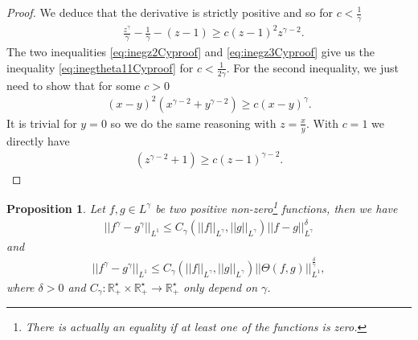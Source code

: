 \documentclass[a4paper, 15pt]{article}
\numberwithin{equation}{section}
\newtheorem{propal}[defi]{Proposition}
\begin{document}
\begin{proof}
  We deduce that the derivative is strictly positive and so for $c<\frac{1}{\gamma}$
  \begin{align}
  \label{eq:inegz3Cyproof}
       &\frac{z^\gamma}{\gamma}-\frac{1}{\gamma}-(z-1)\geq c(z-1)^2z^{\gamma-2}.
  \end{align}
  The two inequalities \eqref{eq:inegz2Cyproof} and \eqref{eq:inegz3Cyproof} give us the inequality  \eqref{eq:inegtheta11Cyproof} for $c<\frac{1}{2\gamma}$.
  For the second inequality, we just need to show that for some $c>0$
   \begin{align*}
     (x-y)^2(x^{\gamma-2}+y^{\gamma-2})\geq c(x-y)^\gamma.
    \end{align*}
  It is trivial for $y=0$ so we do the same reasoning with $z=\frac{x}{y}$. With $c=1$ we directly have 
  \begin{align*}
  (z^{\gamma-2}+1)\geq c(z-1)^{\gamma-2}.
    \end{align*}
\end{proof}
\begin{propal}
\label{propal:inegtheta2Cyproof}
Let $f,g\in L^\gamma$ be two positive non-zero\footnote{There is actually an equality if at least one of the functions is zero.} functions, then we have 
\begin{align}
\label{eq:inegtheta21Cyproof}
    ||f^\gamma-g^\gamma||_{L^1}\leq C_\gamma(||f||_{L^{\gamma}},||g||_{L^{\gamma}})||f-g||^\delta_{L^\gamma}
\end{align}
and  
\begin{align}
\label{eq:inegtheta22Cyproof}
    ||f^\gamma-g^\gamma||_{L^1}\leq C_\gamma(||f||_{L^{\gamma}},||g||_{L^{\gamma}})||\Theta(f,g)||^{\frac{\delta}{\gamma}}_{L^1},
\end{align}
where $\delta>0$ and $C_\gamma:\mathbb{R}^\star_+\times\mathbb{R}^\star_+\to\mathbb{R}^\star_+$ only depend on $\gamma$.
\end{propal}
\end{document}

